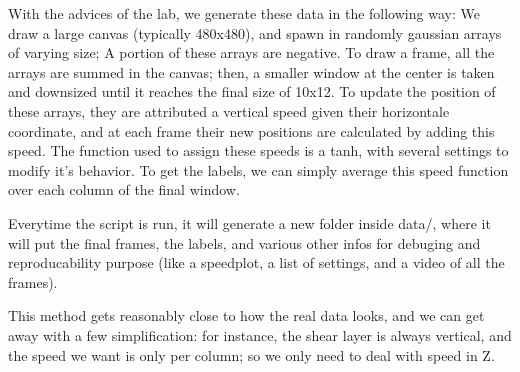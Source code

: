 \documentclass[10pt,conference]{IEEEtran}
\begin{document}
With the advices of the lab, we generate these data in the following way: We draw a large canvas (typically 480x480), and spawn in randomly gaussian arrays of varying size; A portion of these arrays are negative. To draw a frame, all the arrays are summed in the canvas; then, a smaller window at the center is taken and downsized until it reaches the final size of 10x12.
To update the position of these arrays, they are attributed a vertical speed given their horizontale coordinate, and at each frame their new positions are calculated by adding this speed. The function used to assign these speeds is a tanh, with several settings to modify it's behavior. 
To get the labels, we can simply average this speed function over each column of the final window.

Everytime the script is run, it will generate a new folder inside data/, where it will put the final frames, the labels, and various other infos for debuging and reproducability purpose (like a speedplot, a list of settings, and a video of all the frames).

This method gets reasonably close to how the real data looks, and we can get away with a few simplification: for instance, the shear layer is always vertical, and the speed we want is only per column; so we only need to deal with speed in Z.
\end{document}
